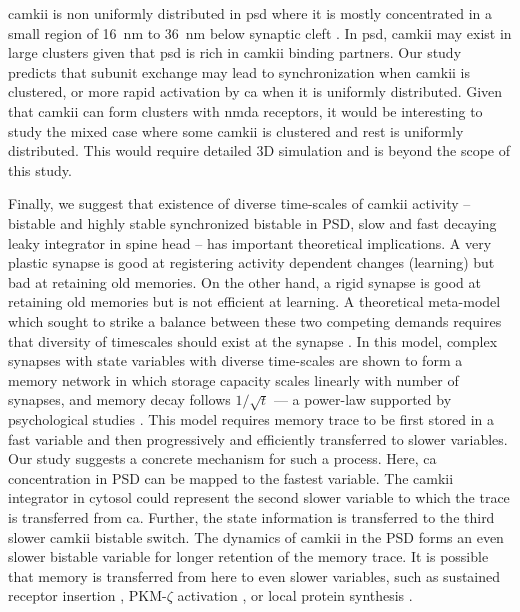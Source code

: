 \documentclass[9pt,lineno,doublespacing]{elife}
\begin{document}
\Gls{camkii} is non uniformly distributed in \gls{psd} where it is mostly
concentrated in a small region of \SI{16}{\nano \meter} to \SI{36}{\nano \meter}
below synaptic cleft \citep{petersen_distribution_2003}. In \gls{psd},
\gls{camkii} may exist in large clusters given that \gls{psd} is rich in
\gls{camkii} binding partners.  Our study predicts that subunit exchange may
lead to synchronization when \gls{camkii} is clustered, or more rapid activation
by \gls{ca} when it is uniformly distributed. Given that \gls{camkii} can form
clusters with \gls{nmda} receptors, it would be interesting to study the mixed
case where some \gls{camkii} is clustered and rest is uniformly distributed.
This would require detailed 3D simulation and is beyond the scope of this study.

Finally, we suggest that existence of diverse time-scales of \gls{camkii}
activity -- bistable and highly stable synchronized bistable in PSD, slow and
fast decaying leaky integrator in spine head -- has important theoretical
implications. A very plastic synapse is good at registering activity dependent
changes (learning) but bad at retaining old memories. On the other hand, a rigid
synapse is good at retaining old memories but is not efficient at learning. A
theoretical meta-model which sought to strike a balance between these two
competing demands requires that diversity of timescales should exist at the
synapse \citep{benna_computational_2016}. In this model, complex synapses with
state variables with diverse time-scales are shown to form a memory network in
which storage capacity scales linearly with number of synapses, and memory decay
follows \(1/\sqrt{t}\) --- a power-law supported by psychological studies
\citep{wixted_form_1991}. This model requires memory trace to be first stored in
a fast variable and then progressively and efficiently transferred to slower
variables.  Our study suggests a concrete mechanism for such a process. Here,
\gls{ca} concentration in PSD can be mapped to the fastest variable.  The
\gls{camkii} integrator in cytosol could represent the second slower variable to
which the trace is transferred from \gls{ca}. Further, the state information is
transferred to the third slower \gls{camkii} bistable switch. The dynamics of
\gls{camkii} in the PSD forms an even slower bistable variable for longer
retention of the memory trace. It is possible that memory is transferred from
here to even slower variables, such as sustained receptor insertion
\citep{hayer_molecular_2005}, PKM-$\zeta$ activation
\citep{sacktor_memory_2012}, or local protein synthesis
\citep{aslam_translational_2009}.
\end{document}
